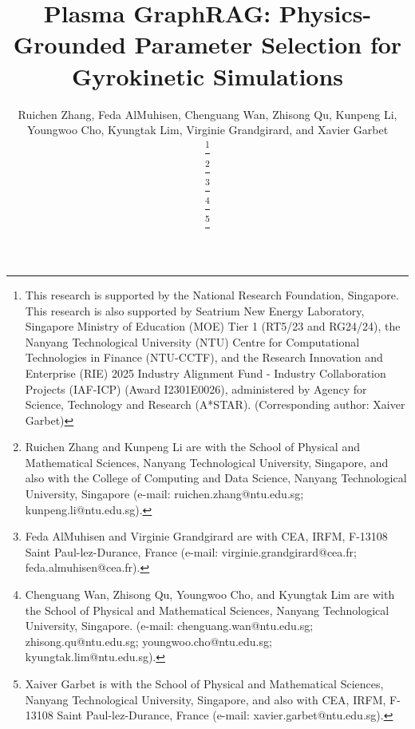 \documentclass[journal]{IEEEtran}
\begin{document}
\title{Plasma GraphRAG: Physics-Grounded Parameter Selection for Gyrokinetic Simulations}

\author{Ruichen Zhang, Feda AlMuhisen, Chenguang Wan, Zhisong Qu, Kunpeng Li, Youngwoo Cho, Kyungtak Lim, Virginie Grandgirard, and Xavier Garbet

\thanks{
This research is supported by the National Research Foundation, Singapore. This research is also supported by Seatrium New Energy Laboratory, Singapore Ministry of Education (MOE) Tier 1 (RT5/23 and RG24/24), the Nanyang Technological University (NTU) Centre for Computational Technologies in Finance (NTU-CCTF), and the Research Innovation and Enterprise (RIE) 2025 Industry Alignment Fund - Industry Collaboration Projects (IAF-ICP) (Award I2301E0026), administered by Agency for Science, Technology and Research (A*STAR). (Corresponding author: Xaiver Garbet)}

\thanks{Ruichen Zhang and Kunpeng Li are with the School of Physical and Mathematical Sciences, Nanyang Technological University, Singapore, and also with the College of Computing and Data Science, Nanyang Technological University, Singapore (e-mail: ruichen.zhang@ntu.edu.sg; kunpeng.li@ntu.edu.sg). }

\thanks{Feda AlMuhisen and Virginie Grandgirard are with CEA, IRFM, F-13108 Saint Paul-lez-Durance, France (e-mail: virginie.grandgirard@cea.fr;  feda.almuhisen@cea.fr).}

\thanks{Chenguang Wan, Zhisong Qu, Youngwoo Cho, and Kyungtak Lim are with the School of Physical and Mathematical Sciences, Nanyang Technological University, Singapore. (e-mail: chenguang.wan@ntu.edu.sg; zhisong.qu@ntu.edu.sg; youngwoo.cho@ntu.edu.sg; kyungtak.lim@ntu.edu.sg).}


\thanks{
Xaiver Garbet is with the School of Physical and Mathematical Sciences, Nanyang Technological University, Singapore, and also with CEA, IRFM, F-13108 Saint Paul-lez-Durance, France (e-mail: xavier.garbet@ntu.edu.sg). }
}
\maketitle
\end{document}
